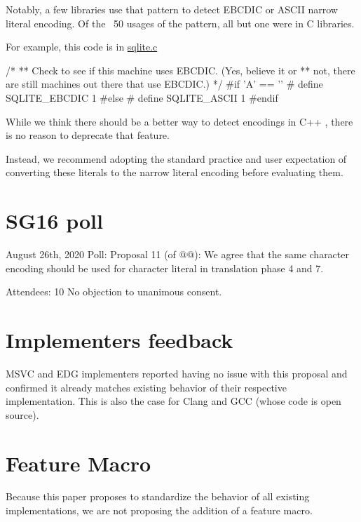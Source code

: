 \documentclass{wg21}
\begin{document}
Notably, a few libraries use that pattern to detect EBCDIC or ASCII narrow literal encoding.
Of the ~50 usages of the pattern, all but one were in C libraries.

\begin{quoteblock}
For example, this code is in \href{https://github.com/sqlite/sqlite/blob/master/src/sqliteInt.h#L739}{sqlite.c}

\begin{colorblock}
/*
** Check to see if this machine uses EBCDIC.  (Yes, believe it or
** not, there are still machines out there that use EBCDIC.)
*/
#if 'A' == ''
# define SQLITE_EBCDIC 1
#else
# define SQLITE_ASCII 1
#endif
\end{colorblock}
\end{quoteblock}


While we think there should be a better way to detect encodings in C++ \cite{P1885R2}, there is no reason to deprecate that feature.

Instead, we recommend adopting the standard practice and user expectation of converting these literals to the narrow literal encoding before evaluating them.

\section{SG16 poll}

\begin{codeblock}
August 26th, 2020
Poll: Proposal 11 (of  @@): We agree that the same character encoding should be used 
for character literal in translation phase 4 and 7.

Attendees: 10
No objection to unanimous consent.
\end{codeblock}


\section{Implementers feedback}

MSVC and EDG implementers reported having no issue with this proposal and confirmed it already matches existing behavior of their respective implementation.
This is also the case for Clang and GCC (whose code is open source). 

\section{Feature Macro}

Because this paper proposes to standardize the behavior of all existing implementations, we are not proposing the addition of a feature macro.
\end{document}
